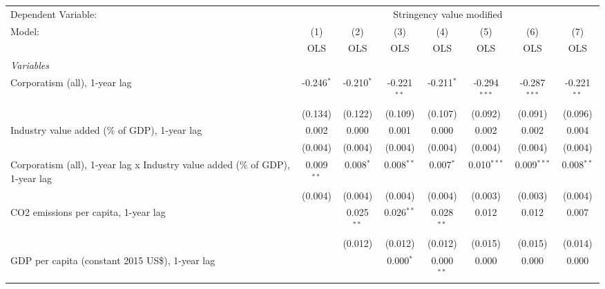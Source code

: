 
\begingroup
\centering
\begin{tabular}{lccccccc}
   \toprule
   Dependent Variable: & \multicolumn{7}{c}{Stringency value modified}\\
   Model:                                                                        & (1)          & (2)          & (3)           & (4)          & (5)            & (6)            & (7)\\  
                                                                                 &  OLS         & OLS          & OLS           & OLS          & OLS            & OLS            & OLS\\  
   \midrule
   \emph{Variables}\\
   Corporatism (all), 1-year lag                                                 & -0.246$^{*}$ & -0.210$^{*}$ & -0.221$^{**}$ & -0.211$^{*}$ & -0.294$^{***}$ & -0.287$^{***}$ & -0.221$^{**}$\\   
                                                                                 & (0.134)      & (0.122)      & (0.109)       & (0.107)      & (0.092)        & (0.091)        & (0.096)\\   
   Industry value added (\% of GDP), 1-year lag                                  & 0.002        & 0.000        & 0.001         & 0.000        & 0.002          & 0.002          & 0.004\\   
                                                                                 & (0.004)      & (0.004)      & (0.004)       & (0.004)      & (0.004)        & (0.004)        & (0.004)\\   
   Corporatism (all), 1-year lag x Industry value added (\% of GDP), 1-year lag  & 0.009$^{**}$ & 0.008$^{*}$  & 0.008$^{**}$  & 0.007$^{*}$  & 0.010$^{***}$  & 0.009$^{***}$  & 0.008$^{**}$\\   
                                                                                 & (0.004)      & (0.004)      & (0.004)       & (0.004)      & (0.003)        & (0.003)        & (0.004)\\   
   CO2 emissions per capita, 1-year lag                                          &              & 0.025$^{**}$ & 0.026$^{**}$  & 0.028$^{**}$ & 0.012          & 0.012          & 0.007\\   
                                                                                 &              & (0.012)      & (0.012)       & (0.012)      & (0.015)        & (0.015)        & (0.014)\\   
   GDP per capita (constant 2015 US\$), 1-year lag                               &              &              & 0.000$^{*}$   & 0.000$^{**}$ & 0.000          & 0.000          & 0.000\\   

\end{tabular}

